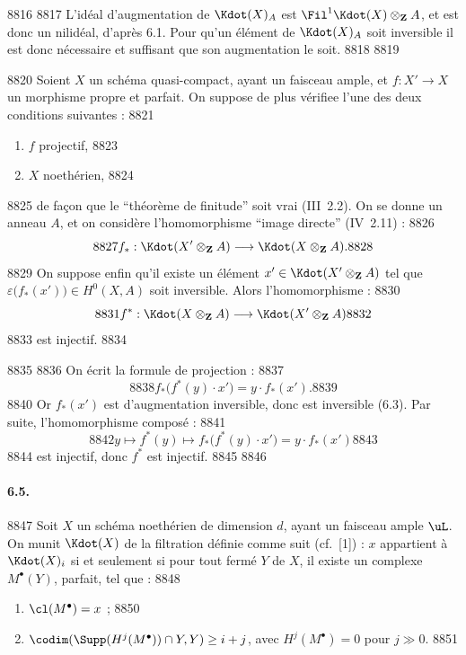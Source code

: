  8816	
  8817	L'id\'eal d'augmentation de $\Kdot(X)_A$ est $\Fil^1 \Kdot(X) \otimes_{\mathbf{Z}} A$, et est donc un nilid\'eal, d'apr\`es 6.1. Pour qu'un \'el\'ement de $\Kdot(X)_A$ soit inversible il est donc n\'ecessaire et suffisant que son augmentation le soit.
  8818	
  8819	\begin{corollaire}[6.4]
  8820	Soient $X$ un sch\'ema quasi-compact, ayant un faisceau ample, et $f: X' \to X$ un morphisme propre et parfait. On suppose de plus v\'erifiee l'une des deux conditions suivantes :
  8821	\begin{enumerate}[label=\roman*)]
  8822	\item $f$ projectif,
  8823	\item $X$ noeth\'erien,
  8824	\end{enumerate}
  8825	de fa\c{c}on que le ``th\'eor\`eme de finitude'' soit vrai (III~2.2). On se donne un anneau $A$, et on consid\`ere l'homomorphisme ``image directe'' (IV~2.11) :
  8826	\[
  8827	f_{*} : \Kdot(X' \otimes_{\mathbf{Z}} A) \longrightarrow \Kdot(X \otimes_{\mathbf{Z}} A).
  8828	\]
  8829	On suppose enfin qu'il existe un \'el\'ement $x' \in \Kdot(X' \otimes_{\mathbf{Z}} A)$ tel que $\varepsilon\bigl(f_{*}(x')\bigr) \in H^0(X, A)$ soit inversible. Alors l'homomorphisme :
  8830	\[
  8831	f^{*} : \Kdot(X \otimes_{\mathbf{Z}} A) \longrightarrow \Kdot(X' \otimes_{\mathbf{Z}} A)
  8832	\]
  8833	est injectif.
  8834	\end{corollaire}
  8835	
  8836	On \'ecrit la formule de projection :
  8837	\[
  8838	f_{*}\bigl(f^{*}(y) \cdot x'\bigr) = y \cdot f_{*}(x').
  8839	\]
  8840	Or $f_{*}(x')$ est d'augmentation inversible, donc est inversible (6.3). Par suite, l'homomorphisme compos\'e :
  8841	\[
  8842	y \longmapsto f^{*}(y) \longmapsto f_{*}\bigl(f^{*}(y) \cdot x'\bigr) = y \cdot f_{*}(x')
  8843	\]
  8844	est injectif, donc $f^{*}$ est injectif.
  8845	
  8846	\paragraph{6.5.}
  8847	Soit $X$ un sch\'ema noeth\'erien de dimension $d$, ayant un faisceau ample $\uL$. On munit $\Kdot(X)$ de la filtration d\'efinie comme suit (cf.~[1]) : $x$ appartient \`a $\Kdot(X)_i$ si et seulement si pour tout ferm\'e $Y$ de $X$, il existe un complexe $M^{\bullet}(Y)$, parfait, tel que :
  8848	\begin{enumerate}[label=\alph*)]
  8849	\item $\cl(M^{\bullet}) = x$ ;
  8850	\item $\codim(\Supp(H^j(M^{\bullet})) \cap Y, Y) \geq i + j$, avec $H^j(M^{\bullet}) = 0$ pour $j \gg 0$.
  8851	\end{enumerate}
